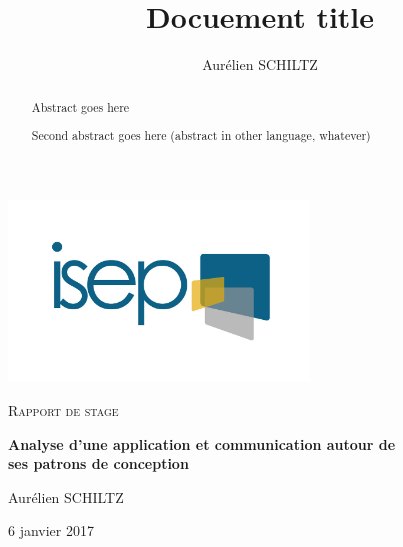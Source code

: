 \newcommand*{\ROOT}{./src}



\graphicspath{{\ROOT/}}


\title{Docuement title}
\author{Aurélien SCHILTZ}

\makeatletter
{}
\makeatother



\begin{titlepage}
	\centering
	\includegraphics[width=8cm]{logo}
	\par
	\vspace{4cm}

	{\scshape\Large Rapport de stage\par}
	\vspace{1.5cm}
	{\huge\bfseries Analyse d'une application et communication autour de \\ses patrons de conception\par}
	\vspace{2cm}
	{\Large Aurélien SCHILTZ\par}
	\vfill\par
	\par
	\vfill

	{\large 6 janvier 2017}
\end{titlepage}


\newpage
\begin{abstract}

  Abstract goes here

\end{abstract}

\renewcommand{\abstractname}{Second Abstract}

\vspace{3cm}

\begin{abstract}

Second abstract goes here (abstract in other language, whatever)

\end{abstract}

